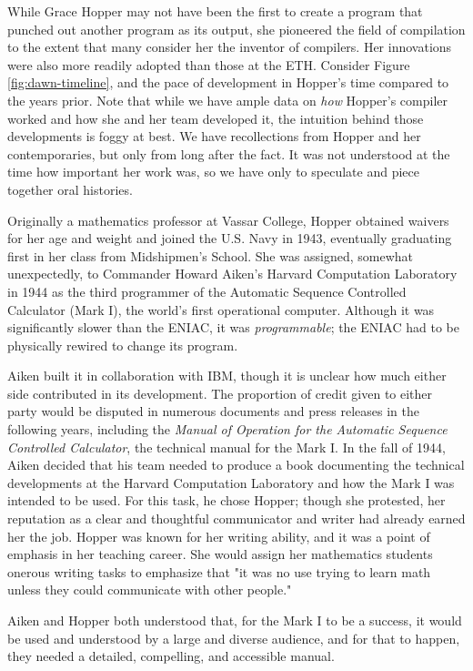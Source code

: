 While Grace Hopper may not have been the first to create a program that
punched out another program as its output, she pioneered the field of
compilation to the extent that many consider her the inventor of compilers.
Her innovations were also more readily adopted than those at the ETH.
Consider Figure \ref{fig:dawn-timeline}, and the pace of development in Hopper's time
compared to the years prior.
Note that while we have ample data on \textit{how} Hopper's compiler worked and how
she and her team developed it, the intuition behind those developments is foggy at best.
We have recollections from Hopper and her contemporaries, but only from long after the fact.
It was not understood at the time how important her work was, so we have
only to speculate and piece together oral histories.

Originally a mathematics professor at Vassar College, Hopper obtained waivers for her age and weight and
joined the U.S. Navy in 1943, eventually graduating first in her class from Midshipmen's School.
She was assigned, somewhat unexpectedly, to Commander Howard Aiken's Harvard Computation Laboratory in 1944
as the third programmer of the Automatic Sequence Controlled Calculator (Mark I), 
the world's first operational computer.
Although it was significantly slower than the ENIAC, it was \textit{programmable};
the ENIAC had to be physically rewired to change its program.

Aiken built it in collaboration with IBM, though it is unclear how much either side contributed
in its development.
The proportion of credit given to either party would be disputed in numerous documents and press releases
in the following years, including the
\textit{Manual of Operation for the Automatic Sequence Controlled Calculator},
the technical manual for the Mark I.
In the fall of 1944, Aiken decided that his team needed to produce a book documenting the technical
developments at the Harvard Computation Laboratory and how the Mark I was intended to be used.
For this task, he chose Hopper; though she protested, her reputation as a clear and
thoughtful communicator and writer had already earned her the job.
Hopper was known for her writing ability, and it was a point of emphasis in her teaching career.
She would assign her mathematics students onerous writing tasks to emphasize that
"it was no use trying to learn math unless they could communicate with other people."
\cite[interview on 5 July, 1972]{grace_hopper_and_the_invention_of_the_information_age_2009}

Aiken and Hopper both understood that, for the Mark I to be a success, it would be used and
understood by a large and diverse audience, and for that to happen, they needed a detailed,
compelling, and accessible manual.

